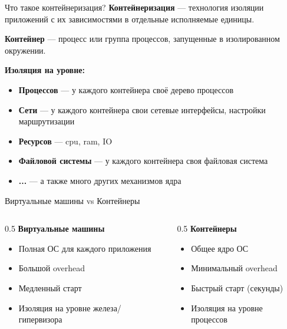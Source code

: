 \documentclass[aspectratio=169]{beamer}
\begin{document}
    \begin{frame}{Что такое контейнеризация?}
        \textbf{Контейнеризация} — технология изоляции приложений с их зависимостями в отдельные исполняемые единицы.

        \textbf{Контейнер} — процесс или группа процессов, запущенные в изолированном окружении.

        \vspace{0.2cm}

        \textbf{Изоляция на уровне:}
        \begin{itemize}
            \item \textbf{Процессов} — у каждого контейнера своё дерево процессов
            \item \textbf{Сети} — у каждого контейнера свои сетевые интерфейсы, настройки маршрутизации
            \item \textbf{Ресурсов } — cpu, ram, IO
            \item \textbf{Файловой системы } — у каждого контейнера своя файловая система
            \item \textbf{...} — а также много других механизмов ядра
        \end{itemize}
    \end{frame}

    \begin{frame}{Виртуальные машины vs Контейнеры}
        \begin{columns}[t]
            \begin{column}[t]{0.5\textwidth}
                \textbf{Виртуальные машины}
                \begin{itemize}
                    \item Полная ОС для каждого приложения
                    \item Большой overhead
                    \item Медленный старт
                    \item Изоляция на уровне железа/гипервизора
                \end{itemize}
            \end{column}

            \begin{column}[t]{0.5\textwidth}
                \textbf{Контейнеры}
                \begin{itemize}
                    \item Общее ядро ОС
                    \item Минимальный overhead
                    \item Быстрый старт (секунды)
                    \item Изоляция на уровне процессов
                \end{itemize}
            \end{column}
        \end{columns}
    \end{frame}
\end{document}
